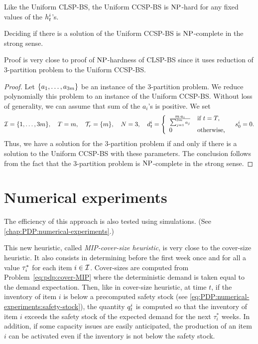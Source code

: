 \medskip


Like the Uniform CLSP-BS, the Uniform CCSP-BS is $\operatorname{NP}$-hard for any fixed values of the $h_t^i$'s.

\begin{thm}
  Deciding if there is a solution of the Uniform CCSP-BS is $\operatorname{NP}$-complete in the strong sense.
\end{thm}


Proof is very close to proof of $\operatorname{NP}$-hardness of CLSP-BS since it uses reduction of 3-partition problem to the Uniform CCSP-BS.


\begin{proof}
Let $\crbracket{a_1,\ldots,a_{3m}}$ be an instance of the 3-partition problem.
We reduce polynomially this problem to an instance of the Uniform CCSP-BS.
Without loss of generality, we can assume that sum of the $a_i$'s is positive.
We set
\begin{equation}
  \REF=\range[1]{3m}
  ,\quad
  \horizon=m
  ,\quad
  \coverset_r=\crbracket{m}
  ,\quad
  \nbsetups=3
  ,\quad
  \demand_t^i
  =\left\{
  \begin{array}{ll}
  \frac{m\,a_i}{\sum_{j=1}^{3m}a_j} & \mbox{if}\ t=\horizon,
  \\
  0 & \mbox{otherwise,}\end{array}
  \right.
  \quad
  \inventory_0^i=0.
\end{equation}
Thus, we have a solution for the 3-partition problem if and only if there is a solution to the Uniform CCSP-BS with these parameters. The conclusion follows from the fact that the 3-partition problem is $\operatorname{NP}$-complete in the strong sense.
\end{proof}


\section{Numerical experiments}
\label{sec:pdp-cover:numerical-experiments}


The efficiency of this approach is also tested using simulations. (See \cref{chap:PDP:numerical-experiments}.)


This new heuristic, called \emph{MIP-cover-size heuristic}, is very close to the cover-size heuristic.
It also consists in determining before the first week once and for all a value $\tau_i^*$ for each item $i\in\mathcal{I}$.
Cover-sizes are computed from Problem~\eqref{eq:pdp:cover-MIP} where the deterministic demand is taken equal to the demand expectation.
Then, like in cover-size heuristic, at time $t$, if the inventory of item $i$ is below a precomputed safety stock (see \cref{eq:PDP:numerical-experiments:safety-stock}), the quantity $q_t^i$ is computed so that the inventory of item $i$ exceeds the safety stock of the expected demand for the next $\tau_i^*$ weeks.
In addition, if some capacity issues are easily anticipated, the production of an item $i$ can be activated even if the inventory is not below the safety stock.


